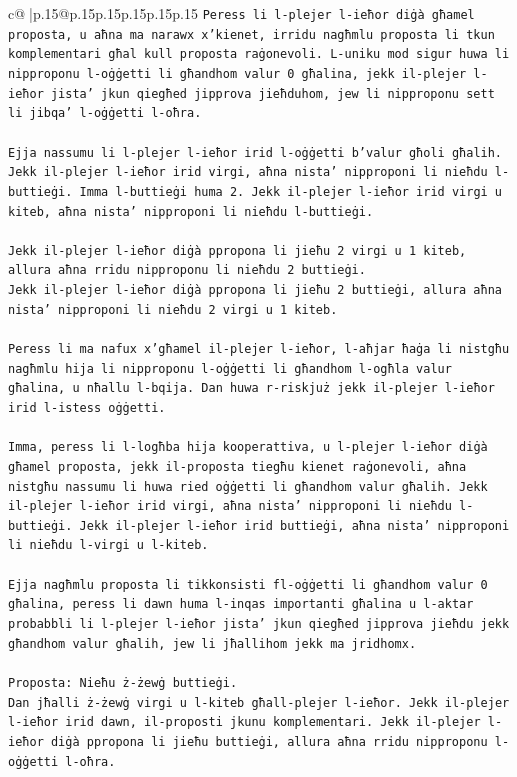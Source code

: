\documentclass{article}
\begin{document}
{\begin{supertabular}{c@{$\;$}|p{.15\linewidth}@{}p{.15\linewidth}p{.15\linewidth}p{.15\linewidth}p{.15\linewidth}p{.15\linewidth}}
{{{\texttt{Peress li l{-}plejer l{-}ieħor diġà għamel proposta, u aħna ma narawx x'kienet, irridu nagħmlu proposta li tkun komplementari għal kull proposta raġonevoli. L{-}uniku mod sigur huwa li nipproponu l{-}oġġetti li għandhom valur 0 għalina, jekk il{-}plejer l{-}ieħor jista' jkun qiegħed jipprova jieħduhom, jew li nipproponu sett li jibqa' l{-}oġġetti l{-}oħra.} \\
\\ 
\texttt{Ejja nassumu li l{-}plejer l{-}ieħor irid l{-}oġġetti b'valur għoli għalih. Jekk il{-}plejer l{-}ieħor irid virgi, aħna nista' nipproponi li nieħdu l{-}buttieġi. Imma l{-}buttieġi huma 2. Jekk il{-}plejer l{-}ieħor irid virgi u kiteb, aħna nista' nipproponi li nieħdu l{-}buttieġi.} \\
\\ 
\texttt{Jekk il{-}plejer l{-}ieħor diġà ppropona li jieħu 2 virgi u 1 kiteb, allura aħna rridu nipproponu li nieħdu 2 buttieġi.} \\
\texttt{Jekk il{-}plejer l{-}ieħor diġà ppropona li jieħu 2 buttieġi, allura aħna nista' nipproponi li nieħdu 2 virgi u 1 kiteb.} \\
\\ 
\texttt{Peress li ma nafux x'għamel il{-}plejer l{-}ieħor, l{-}aħjar ħaġa li nistgħu nagħmlu hija li nipproponu l{-}oġġetti li għandhom l{-}ogħla valur għalina, u nħallu l{-}bqija. Dan huwa r{-}riskjuż jekk il{-}plejer l{-}ieħor irid l{-}istess oġġetti.} \\
\\ 
\texttt{Imma, peress li l{-}logħba hija kooperattiva, u l{-}plejer l{-}ieħor diġà għamel proposta, jekk il{-}proposta tiegħu kienet raġonevoli, aħna nistgħu nassumu li huwa ried oġġetti li għandhom valur għalih. Jekk il{-}plejer l{-}ieħor irid virgi, aħna nista' nipproponi li nieħdu l{-}buttieġi. Jekk il{-}plejer l{-}ieħor irid buttieġi, aħna nista' nipproponi li nieħdu l{-}virgi u l{-}kiteb.} \\
\\ 
\texttt{Ejja nagħmlu proposta li tikkonsisti fl{-}oġġetti li għandhom valur 0 għalina, peress li dawn huma l{-}inqas importanti għalina u l{-}aktar probabbli li l{-}plejer l{-}ieħor jista' jkun qiegħed jipprova jieħdu jekk għandhom valur għalih, jew li jħallihom jekk ma jridhomx.} \\
\\ 
\texttt{Proposta: Nieħu ż{-}żewġ buttieġi.} \\
\texttt{Dan jħalli ż{-}żewġ virgi u l{-}kiteb għall{-}plejer l{-}ieħor. Jekk il{-}plejer l{-}ieħor irid dawn, il{-}proposti jkunu komplementari. Jekk il{-}plejer l{-}ieħor diġà ppropona li jieħu buttieġi, allura aħna rridu nipproponu l{-}oġġetti l{-}oħra.} \\
}}}
\end{supertabular}}
\end{document}
